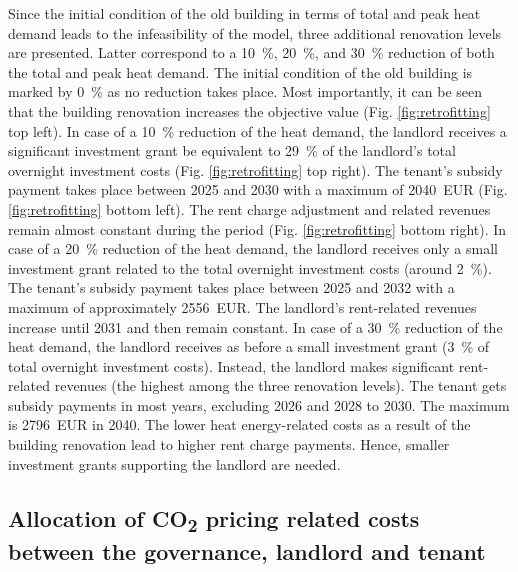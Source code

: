 Since the initial condition of the old building in terms of total and peak heat demand leads to the infeasibility of the model, three additional renovation levels are presented. Latter correspond to a \SI{10}{\%}, \SI{20}{\%}, and \SI{30}{\%} reduction of both the total and peak heat demand. The initial condition of the old building is marked by \SI{0}{\%} as no reduction takes place. Most importantly, it can be seen that the building renovation increases the objective value (Fig. \ref{fig:retrofitting} top left). In case of a \SI{10}{\%} reduction of the heat demand, the landlord receives a significant investment grant be equivalent to \SI{29}{\%} of the landlord's total overnight investment costs (Fig. \ref{fig:retrofitting} top right). The tenant's subsidy payment takes place between 2025 and 2030 with a maximum of \SI{2040}{EUR} (Fig. \ref{fig:retrofitting} bottom left). The rent charge adjustment and related revenues remain almost constant during the period (Fig. \ref{fig:retrofitting} bottom right). In case of a \SI{20}{\%} reduction of the heat demand, the landlord receives only a small investment grant related to the total overnight investment costs (around \SI{2}{\%}). The tenant's subsidy payment takes place between 2025 and 2032 with a maximum of approximately \SI{2556}{EUR}. The landlord's rent-related revenues increase until 2031 and then remain constant. In case of a \SI{30}{\%} reduction of the heat demand, the landlord receives as before a small investment grant (\SI{3}{\%} of total overnight investment costs). Instead, the landlord makes significant rent-related revenues (the highest among the three renovation levels). The tenant gets subsidy payments in most years, excluding 2026 and 2028 to 2030. The maximum is \SI{2796}{EUR} in 2040. The lower heat energy-related costs as a result of the building renovation lead to higher rent charge payments. Hence, smaller investment grants supporting the landlord are needed. 

\subsection{Allocation of CO\textsubscript{2} pricing related costs between the governance, landlord and tenant}\label{res:co2_shares}

